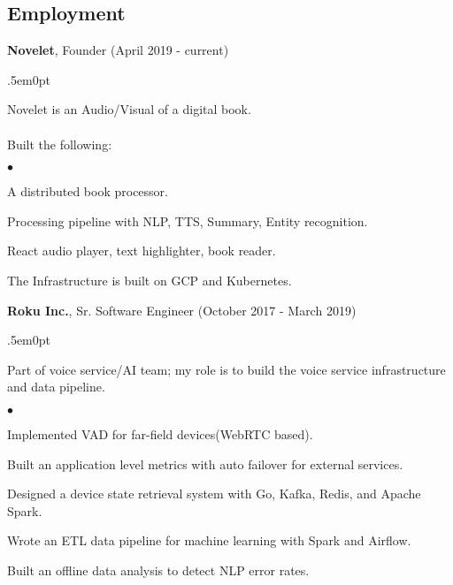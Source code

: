 \documentclass[margin, line, 10pt]{res}
\newenvironment{list2}{
  \begin{list}{$\bullet$}{%
      \setlength{\itemsep}{0in}
      \setlength{\parsep}{0in} \setlength{\parskip}{0in}
      \setlength{\topsep}{0in} \setlength{\partopsep}{0in}
      \setlength{\leftmargin}{0.2in}}}{\end{list}}
\begin{document}
\begin{resume}
\section{Employment}


\vspace{.05cm}

{\Large {\bf Novelet}}, Founder  \hfill (April 2019 - current)\\
\begin{adjustwidth}{.5em}{0pt}

  \vspace{-.3cm}
  Novelet is an Audio/Visual of a digital book.\\ \\
  \vspace{.2cm}
  Built the following:
  \begin{list2}
  \item A distributed book processor.
  \item Processing pipeline with NLP, TTS, Summary, Entity recognition.
  \item React audio player, text highlighter, book reader.
  \item The Infrastructure is built on GCP and Kubernetes.
  \end{list2}
  \vspace{.05cm}
\end{adjustwidth}


{\Large {\bf Roku Inc.}},  Sr. Software Engineer \hfill (October 2017 - March 2019)\\
\begin{adjustwidth}{.5em}{0pt}

  \vspace{-.3cm}
  Part of voice service/AI team; my role is to build the voice service infrastructure and data pipeline.

  \begin{list2}
    \vspace{.2cm}
  \item Implemented VAD for far-field devices(WebRTC based).
  \item Built an application level metrics with auto failover for external services.
  \item Designed a device state retrieval system with Go, Kafka, Redis, and Apache Spark.
  \item Wrote an ETL data pipeline for machine learning with Spark and Airflow.
  \item Built an offline data analysis to detect NLP error rates.
  \end{list2}
  \vspace{.05cm}
\end{adjustwidth}


\end{resume}
\end{document}
